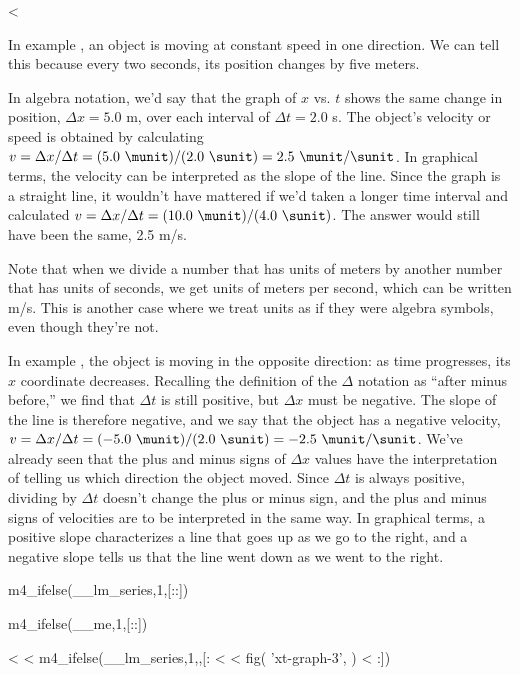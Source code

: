 <%

In example , an object is moving at constant speed in one
direction.  We can tell this because every two seconds, its
position changes by five meters.

In algebra notation, we'd say that the graph of $x$ vs. $t$
shows the same change in position, $\Delta x=5.0$ m, over
each interval of $\Delta t=2.0$ s.  The object's velocity
or speed is obtained by calculating 
$v=\Delta x/\Delta t=(5.0\ \munit)/(2.0\ \sunit)=2.5\ \munit/\sunit$.
In graphical terms, the
velocity can be interpreted as the slope of the line.  Since
the graph is a straight line, it wouldn't have mattered if
we'd taken a longer time interval and calculated 
$v=\Delta x/\Delta t=(10.0\ \munit)/(4.0\ \sunit)$.  The answer would still have
been the same, 2.5 m/s.

Note that when we divide a number that has units of meters
by another number that has units of seconds, we get units of
meters per second, which can be written m/s.  This is
another case where we treat units as if they were algebra
symbols, even though they're not.

In example , the object is moving in the opposite
direction: as time progresses, its $x$ coordinate decreases.
Recalling the definition of the $\Delta$ notation as
``after minus before,'' we find that $\Delta t$ is still
positive, but $\Delta x$ must be negative.  The slope of the
line is therefore negative, and we say that the object has a
negative velocity, 
$v=\Delta x/\Delta t=(-5.0\ \munit)/(2.0\ \sunit)=-2.5\ \munit/\sunit$.
We've already seen that the plus and minus
signs of $\Delta x$ values have the interpretation of
telling us which direction the object moved.  Since $\Delta t$
is always positive, dividing by $\Delta t$ doesn't change
the plus or minus sign, and the plus and minus signs of
velocities are to be interpreted in the same way.  In
graphical terms, a positive slope characterizes a line that
goes up as we go to the right, and a negative slope tells us
that the line went down as we went to the right.

m4_ifelse(__lm_series,1,[::])

m4_ifelse(__me,1,[:\pagebreak[4]:])

<%
<%
m4_ifelse(__lm_series,1,,[:
<%
<%
  fig(
    'xt-graph-3',
  )
<%
:])

